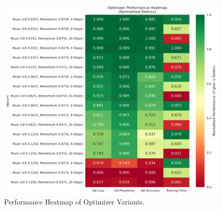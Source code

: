 \documentclass{article}
\begin{document}
\begin{figure}[h!]
    \centering
    \includegraphics[width=\textwidth]{images/performance_heatmap.png}
    \caption{Performance Heatmap of Optimizer Variants.}
    \label{fig:performance_heatmap}
\end{figure}
\end{document}
